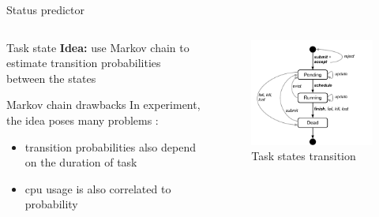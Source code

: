 \documentclass[10pt,xcolor={dvipsnames}, aspectratio=169]{beamer}
\begin{document}
\begin{frame}
{Status predictor}
	\begin{columns}[T]
	
		\begin{column}{0.48\textwidth}
			\begin{block}
			{Task state}
				\textbf{Idea: } use Markov chain to estimate transition probabilities between the states
			\end{block}
			
			\begin{block}
			{Markov chain drawbacks}
			In experiment, the idea poses many problems :
				\begin{itemize}
					\item transition probabilities also depend on the duration of task
					\item cpu usage is also correlated to probability
				\end{itemize}
			\end{block}
		
		\end{column}

		\hfill		
		
		\begin{column}{0.48\textwidth}
			\begin{figure}
				\centering
				\includegraphics[scale=0.5]{images/task_states.png}
				\caption{Task states transition}
			\end{figure}		
		\end{column}
	\end{columns}

\end{frame}
\end{document}
